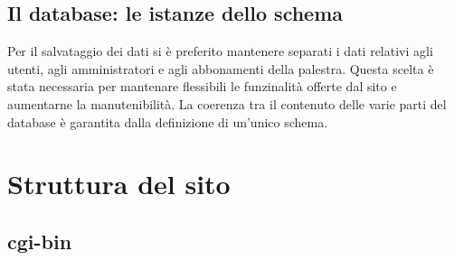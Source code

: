 \documentclass[12pt,a4paper]{article}
\begin{document}
\subsection{Il database: le istanze dello schema}
Per il salvataggio dei dati si è preferito mantenere separati i dati relativi agli utenti, agli amministratori e agli abbonamenti della palestra. 
Questa scelta è stata necessaria per mantenare flessibili le funzinalità offerte dal sito e aumentarne la manutenibilità.
La coerenza tra il contenuto delle varie parti del database è garantita dalla definizione di un'unico schema. 
\appendix
\section{Struttura del sito}
\subsection{cgi-bin}
\end{document}
